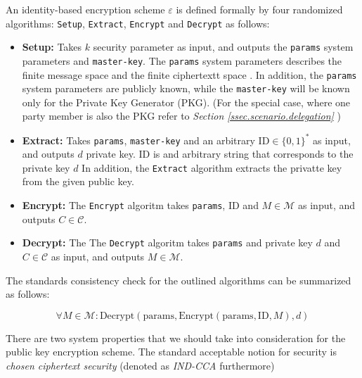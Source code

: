 
An identity-based encryption scheme $\varepsilon$ is defined formally
by four randomized algorithms: \lstinline{Setup}, \lstinline{Extract},
\lstinline{Encrypt} and \lstinline{Decrypt} as follows:

\begin{itemize}
    \item[] \textbf{Setup:} Takes $k$ security parameter as input, and outputs the \lstinline{params} system parameters and \lstinline{master-key}.
            The \lstinline{params} system parameters describes the finite message space
             and the finite ciphertextt space .
            In addition, the \lstinline{params} system parameters are publicly known,
            while the \lstinline{master-key} will be known only for the Private Key Generator (PKG).
            (For the special case, where one party member is also the PKG refer to \textit{Section \ref{ssec.scenario.delegation}} )

    \item[] \textbf{Extract:} Takes \lstinline{params}, \lstinline{master-key} and an arbitrary $\mathrm{ID} \in \{0,1\}^*$ as input,
            and outputs $d$ private key. $\mathrm{ID}$ is and arbitrary string that corresponds to the private key $d$
            In addition, the \lstinline{Extract} algorithm extracts the privatte key from the given public key.

    \item[] \textbf{Encrypt:} The \lstinline{Encrypt} algoritm takes \lstinline{params}, $\mathrm{ID}$ and $M \in \mathcal{M}$ as input,
            and outputs $C \in \mathcal{C}$.
    \item[] \textbf{Decrypt:} The The \lstinline{Decrypt} algoritm takes \lstinline{params} and private key $d$ and $C \in \mathcal{C}$ as input,
    and outputs $M \in \mathcal{M}$.
\end{itemize}

The standards consistency check for the outlined algorithms can be
summarized as follows:

\begin{equation*}
\forall M \in \mathcal{M}: \mathrm{Decrypt}(\mathrm{params}, \mathrm{Encrypt}(\mathrm{params}, \mathrm{ID}, M),d)
\end{equation*}

There are two system properties that we should take into consideration for
the public key encryption scheme. The standard acceptable notion for security
is \textit{chosen ciphertext security} (denoted as \textit{IND-CCA} furthermore)
